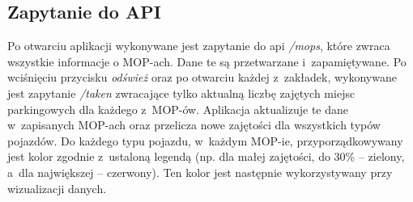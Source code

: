 \subsection{Zapytanie do API}
Po otwarciu aplikacji wykonywane jest zapytanie do \acrshort{api} \textit{/mops}, które zwraca wszystkie informacje o MOP-ach. Dane te są przetwarzane i~zapamiętywane.
Po wciśnięciu przycisku \textit{odśwież} oraz po otwarciu każdej z~zakładek, wykonywane jest zapytanie \textit{/taken} zwracające tylko aktualną liczbę zajętych miejsc parkingowych dla każdego z~MOP-ów. Aplikacja aktualizuje te dane w~zapisanych MOP-ach oraz przelicza nowe zajętości dla wszystkich typów pojazdów.
Do każdego typu pojazdu, w~każdym MOP-ie, przyporządkowywany jest kolor zgodnie z~ustaloną legendą (np. dla małej zajętości, do 30\% -- zielony, a~dla największej -- czerwony). Ten kolor jest następnie wykorzystywany przy wizualizacji danych.


